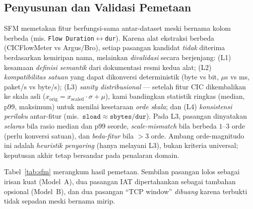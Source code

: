\documentclass[11pt,a4paper]{article}
\begin{document}
\subsection{Penyusunan dan Validasi Pemetaan}
\label{sec:sfmmap}
SFM memetakan fitur berfungsi-sama antar-dataset meski bernama kolom berbeda
(mis. \texttt{Flow Duration}$\leftrightarrow$\texttt{dur}). Karena alat ekstraksi
berbeda (CICFlowMeter vs Argus/Bro), setiap pasangan kandidat \emph{tidak} diterima
berdasarkan kemiripan nama, melainkan \emph{divalidasi} secara berjenjang: (L1)
kesamaan \emph{definisi semantik} dari dokumentasi resmi kedua alat; (L2)
\emph{kompatibilitas satuan} yang dapat dikonversi deterministik (byte vs bit,
$\mu$s vs ms, paket/s vs byte/s); (L3) \emph{sanity distribusional} --- setelah fitur
CIC dikembalikan ke skala asli ($x_{\text{orig}} = x_{\text{scaled}}\cdot\sigma + \mu$),
kami bandingkan statistik ringkas (median, p99, maksimum) untuk menilai kesetaraan
\emph{orde skala}; dan (L4) \emph{konsistensi perilaku} antar-fitur
(mis.\ $\mathtt{sload}\approx\mathtt{sbytes}/\mathtt{dur}$). Pada L3, pasangan
dinyatakan \emph{selaras} bila rasio median dan p99 seorde, \emph{scale-mismatch} bila
berbeda $1$--$3$ orde (perlu konversi satuan), dan \emph{beda-fitur} bila $>3$ orde.
Ambang orde-magnitudo ini adalah \emph{heuristik penyaring} (hanya melayani L3), bukan
kriteria universal; keputusan akhir tetap bersandar pada penalaran domain.

Tabel~\ref{tab:sfm} merangkum hasil pemetaan. Sembilan pasangan lolos sebagai
irisan kuat (Model~A), dua pasangan IAT dipertahankan sebagai tambahan opsional
(Model~B), dan dua pasangan ``TCP window'' \emph{dibuang} karena terbukti tidak
sepadan meski bernama mirip.
\end{document}
